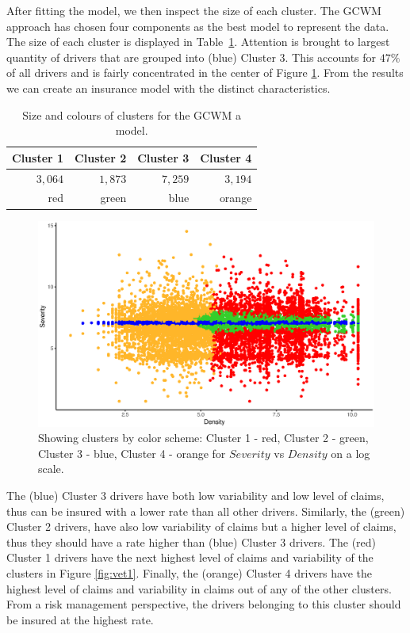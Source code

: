 \documentclass[12pt,letterpaper]{article}
\numberwithin{equation}{section}
\numberwithin{equation}{section}
\numberwithin{equation}{section}
\begin{document}
After fitting the model, we then inspect the size of each cluster. The GCWM approach has chosen four components as the best model to represent the data. The size of each cluster is displayed in Table~\ref{table:sizeSev}. Attention is brought to largest quantity of drivers that are grouped into (blue) Cluster 3. This accounts for $ 47 \% $ of all drivers and is fairly concentrated in the center of Figure \ref{fig:vet1a}. From the results we can create an insurance model with the distinct characteristics.
\begin{table}[!htb]
\centering
\caption{Size and colours of clusters for the GCWM a model.}
\label{table:sizeSev}
\begin{tabular}{rrrr}
\hline
Cluster 1   & Cluster 2  & Cluster 3   & Cluster 4    \\
\hline
$3,064$ & $1,873$  &$ 7,259$ & $3,194$ \\
red & green & blue & orange \\

\hline
\end{tabular}
\end{table}
\begin{figure}[!htb]
\begin{center}
\includegraphics[scale=0.60]{sevClusterPlot.eps}
\end{center}
\vspace{-0.2in}
\caption{Showing clusters by color scheme: Cluster 1 - red, Cluster 2 - green, Cluster 3 - blue, Cluster 4 - orange for $Severity$ vs $Density$ on a log scale. }
\label{fig:vet1a}
\end{figure}


The (blue) Cluster 3 drivers have both low variability and low level of claims, thus can be insured with a lower rate than all other drivers. Similarly, the (green) Cluster 2 drivers, have also low variability of claims but a higher level of claims, thus they should have a rate higher than (blue) Cluster 3  drivers. The (red) Cluster 1 drivers have the next highest level of claims and variability of the clusters in Figure \ref{fig:vet1}. Finally, the (orange) Cluster 4  drivers have the highest level of claims and variability in claims out of any of the other clusters. From a risk management perspective, the drivers belonging to  this cluster should be insured at the highest rate.
\end{document}
